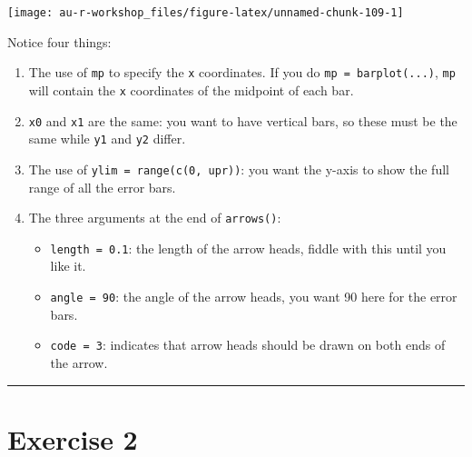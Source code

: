 \documentclass[]{book}
\providecommand{\tightlist}{%
  \setlength{\itemsep}{0pt}\setlength{\parskip}{0pt}}
\theoremstyle{definition}
\theoremstyle{definition}
\theoremstyle{definition}
\theoremstyle{remark}
\begin{document}
\begin{center}\texttt{[image: au-r-workshop\_files/figure-latex/unnamed-chunk-109-1]} \end{center}

Notice four things:

\begin{enumerate}
\def\labelenumi{\arabic{enumi}.}
\tightlist
\item
  The use of \texttt{mp} to specify the \texttt{x} coordinates. If you
  do \texttt{mp\ =\ barplot(...)}, \texttt{mp} will contain the
  \texttt{x} coordinates of the midpoint of each bar.
\item
  \texttt{x0} and \texttt{x1} are the same: you want to have vertical
  bars, so these must be the same while \texttt{y1} and \texttt{y2}
  differ.
\item
  The use of \texttt{ylim\ =\ range(c(0,\ upr))}: you want the y-axis to
  show the full range of all the error bars.
\item
  The three arguments at the end of \texttt{arrows()}:

  \begin{itemize}
  \tightlist
  \item
    \texttt{length\ =\ 0.1}: the length of the arrow heads, fiddle with
    this until you like it.
  \item
    \texttt{angle\ =\ 90}: the angle of the arrow heads, you want 90
    here for the error bars.
  \item
    \texttt{code\ =\ 3}: indicates that arrow heads should be drawn on
    both ends of the arrow.
  \end{itemize}
\end{enumerate}

\begin{center}\rule{0.5\linewidth}{\linethickness}\end{center}

\hypertarget{ex2}{\section*{Exercise 2}\label{ex2}}
\end{document}
